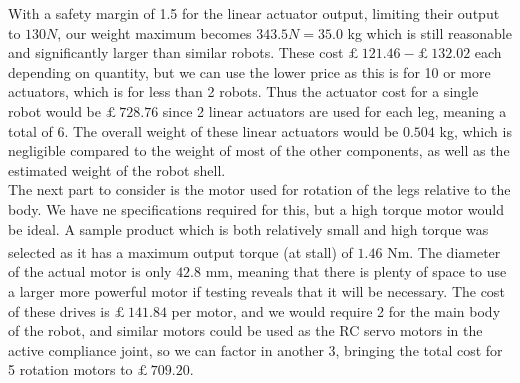 \documentclass[11pt]{article}		%
\begin{document}
		With a safety margin of 1.5 for the linear actuator output, limiting their output to $130 N$, our weight maximum becomes $343.5 N = 35.0$ kg which is still reasonable and significantly larger than similar robots.
		These cost $£ \ 121.46 - £ \ 132.02$ each depending on quantity, but we can use the lower price as this is for 10 or more actuators, which is for less than 2 robots. 
		Thus the actuator cost for a single robot would be $£ \ 728.76$ since 2 linear actuators are used for each leg, meaning a total of 6.
		The overall weight of these linear actuators would be $0.504$ kg, which is negligible compared to the weight of most of the other components, as well as the estimated weight of the robot shell.
		\\
		The next part to consider is the motor used for rotation of the legs relative to the body. We have ne specifications required for this, but a high torque motor would be ideal.
		A sample product which is both relatively small and high torque was selected\textsuperscript{\cite{rsproRotation}} as it has a maximum output torque (at stall) of $1.46$ Nm.
		The diameter of the actual motor is only $42.8$ mm, meaning that there is plenty of space to use a larger more powerful motor if testing reveals that it will be necessary.
		The cost of these drives is $£ \ 141.84$ per motor, and we would require 2 for the main body of the robot, and similar motors could be used as the RC servo motors in the active compliance joint, so we can factor in another 3, bringing the total cost for 5 rotation motors to $£ \ 709.20$.
		\\
\end{document}
